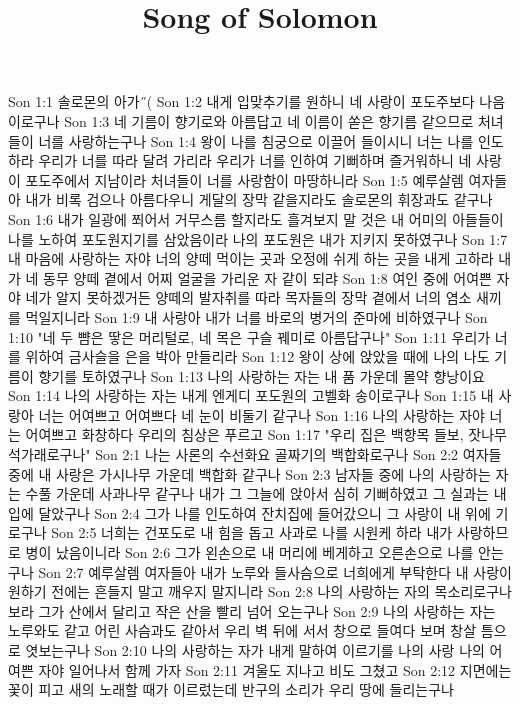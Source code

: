 

\title{Song of Solomon}

Son 1:1  솔로몬의 아가˝(
Son 1:2  내게 입맞추기를 원하니 네 사랑이 포도주보다 나음이로구나
Son 1:3  네 기름이 향기로와 아름답고 네 이름이 쏟은 향기름 같으므로 처녀들이 너를 사랑하는구나
Son 1:4  왕이 나를 침궁으로 이끌어 들이시니 너는 나를 인도하라 우리가 너를 따라 달려 가리라 우리가 너를 인하여 기뻐하며 즐거워하니 네 사랑이 포도주에서 지남이라 처녀들이 너를 사랑함이 마땅하니라
Son 1:5  예루살렘 여자들아 내가 비록 검으나 아름다우니 게달의 장막 같을지라도 솔로몬의 휘장과도 같구나
Son 1:6  내가 일광에 쬐어서 거무스름 할지라도 흘겨보지 말 것은 내 어미의 아들들이 나를 노하여 포도원지기를 삼았음이라 나의 포도원은 내가 지키지 못하였구나
Son 1:7  내 마음에 사랑하는 자야 너의 양떼 먹이는 곳과 오정에 쉬게 하는 곳을 내게 고하라 내가 네 동무 양떼 곁에서 어찌 얼굴을 가리운 자 같이 되랴
Son 1:8  여인 중에 어여쁜 자야 네가 알지 못하겠거든 양떼의 발자취를 따라 목자들의 장막 곁에서 너의 염소 새끼를 먹일지니라
Son 1:9  내 사랑아 내가 너를 바로의 병거의 준마에 비하였구나
Son 1:10  "네 두 뺨은 땋은 머리털로, 네 목은 구슬 꿰미로 아름답구나"
Son 1:11  우리가 너를 위하여 금사슬을 은을 박아 만들리라
Son 1:12  왕이 상에 앉았을 때에 나의 나도 기름이 향기를 토하였구나
Son 1:13  나의 사랑하는 자는 내 품 가운데 몰약 향낭이요
Son 1:14  나의 사랑하는 자는 내게 엔게디 포도원의 고벨화 송이로구나
Son 1:15  내 사랑아 너는 어여쁘고 어여쁘다 네 눈이 비둘기 같구나
Son 1:16  나의 사랑하는 자야 너는 어여쁘고 화창하다 우리의 침상은 푸르고
Son 1:17  "우리 집은 백향목 들보, 잣나무 석가래로구나"
Son 2:1  나는 사론의 수선화요 골짜기의 백합화로구나
Son 2:2  여자들 중에 내 사랑은 가시나무 가운데 백합화 같구나
Son 2:3  남자들 중에 나의 사랑하는 자는 수풀 가운데 사과나무 같구나 내가 그 그늘에 앉아서 심히 기뻐하였고 그 실과는 내 입에 달았구나
Son 2:4  그가 나를 인도하여 잔치집에 들어갔으니 그 사랑이 내 위에 기로구나
Son 2:5  너희는 건포도로 내 힘을 돕고 사과로 나를 시원케 하라 내가 사랑하므로 병이 났음이니라
Son 2:6  그가 왼손으로 내 머리에 베게하고 오른손으로 나를 안는구나
Son 2:7  예루살렘 여자들아 내가 노루와 들사슴으로 너희에게 부탁한다 내 사랑이 원하기 전에는 흔들지 말고 깨우지 말지니라
Son 2:8  나의 사랑하는 자의 목소리로구나 보라 그가 산에서 달리고 작은 산을 빨리 넘어 오는구나
Son 2:9  나의 사랑하는 자는 노루와도 같고 어린 사슴과도 같아서 우리 벽 뒤에 서서 창으로 들여다 보며 창살 틈으로 엿보는구나
Son 2:10  나의 사랑하는 자가 내게 말하여 이르기를 나의 사랑 나의 어여쁜 자야 일어나서 함께 가자
Son 2:11  겨울도 지나고 비도 그쳤고
Son 2:12  지면에는 꽃이 피고 새의 노래할 때가 이르렀는데 반구의 소리가 우리 땅에 들리는구나
